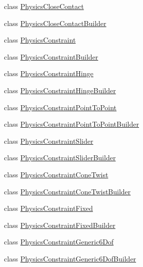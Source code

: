 \begin{DoxyCompactItemize}
\item 
class \mbox{\hyperlink{classnjli_1_1_world_factory_aedf5835c05d4fe2aa76acfe736c1b9fc}{Physics\+Close\+Contact}}
\item 
class \mbox{\hyperlink{classnjli_1_1_world_factory_aae9fd5c0211139108faab6d7ccf95c40}{Physics\+Close\+Contact\+Builder}}
\item 
class \mbox{\hyperlink{classnjli_1_1_world_factory_aa59c958a66870f0d251ec0dd477d2eff}{Physics\+Constraint}}
\item 
class \mbox{\hyperlink{classnjli_1_1_world_factory_aed3f799c6061225153a01b5eb7141786}{Physics\+Constraint\+Builder}}
\item 
class \mbox{\hyperlink{classnjli_1_1_world_factory_a0117dac2d3ca1ac4ebe089ac8c258560}{Physics\+Constraint\+Hinge}}
\item 
class \mbox{\hyperlink{classnjli_1_1_world_factory_aaf6a85f39db8c1e31e6aa37c65e1a674}{Physics\+Constraint\+Hinge\+Builder}}
\item 
class \mbox{\hyperlink{classnjli_1_1_world_factory_a06afcd7f1b1822af8e15e045e77eed2a}{Physics\+Constraint\+Point\+To\+Point}}
\item 
class \mbox{\hyperlink{classnjli_1_1_world_factory_ae8bb8accca080bd60527bc8d691149a6}{Physics\+Constraint\+Point\+To\+Point\+Builder}}
\item 
class \mbox{\hyperlink{classnjli_1_1_world_factory_a6b9fa11eb22d1cb30e2d4fc2247e9afa}{Physics\+Constraint\+Slider}}
\item 
class \mbox{\hyperlink{classnjli_1_1_world_factory_a6b751cf38f887ce08753757be0cccc26}{Physics\+Constraint\+Slider\+Builder}}
\item 
class \mbox{\hyperlink{classnjli_1_1_world_factory_a2ccf10571ac5c97189a4c7d1fe3831ae}{Physics\+Constraint\+Cone\+Twist}}
\item 
class \mbox{\hyperlink{classnjli_1_1_world_factory_a80d4d8b5e97b1f9310737e5230e0ca67}{Physics\+Constraint\+Cone\+Twist\+Builder}}
\item 
class \mbox{\hyperlink{classnjli_1_1_world_factory_a684f5ece6d7d44c2b9f689e76458a8fb}{Physics\+Constraint\+Fixed}}
\item 
class \mbox{\hyperlink{classnjli_1_1_world_factory_a2740ddc13d801da4128c33e9a5b9b492}{Physics\+Constraint\+Fixed\+Builder}}
\item 
class \mbox{\hyperlink{classnjli_1_1_world_factory_a1d2185bf07a23cc48cd8f9d4271f3e39}{Physics\+Constraint\+Generic6\+Dof}}
\item 
class \mbox{\hyperlink{classnjli_1_1_world_factory_aca6d04b7c0d4627405b54ec4ec7af313}{Physics\+Constraint\+Generic6\+Dof\+Builder}}

\end{DoxyCompactItemize}
